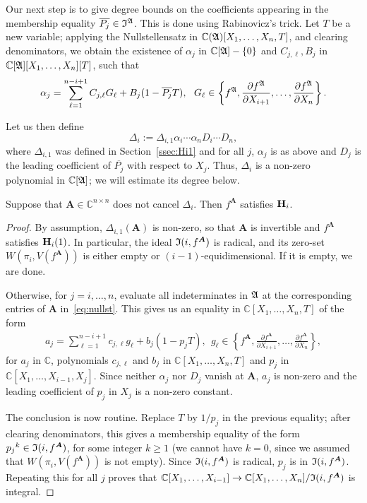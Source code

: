 \documentclass[sigconf]{acmart}
\def\mA{{\bm A}}
\def\pjb{\overline{P_{j}}}
\def\C{\mathbb{C}}
\def\D{\Delta}
\def\I{\frak{I}}
\def\A{\frak{A}}
\begin{document}
Our next step is to give degree bounds on the coefficients appearing
in the membership equality $\pjb \in\I^\A$. This is done using
Rabinovicz's trick. Let $T$ be a new variable; applying the
Nullstellensatz in $\C(\A)[X_1,\dots,X_n,T]$, and clearing
denominators, we obtain the existence of $\alpha_j$ in
$\C[\A]-\{0\}$ and $ C_{j,\ell},B_j$ in
$\C[\A][X_1,\dots,X_n][T]$, such that
\begin{align}\label{eq:nullst}
\alpha_j = \sum_{\ell=1}^{n-i+1} C_{j,\ell} G_\ell + B_j (1-\pjb T),\ \  G_\ell \in 
\left\{ 
f^\A,\frac{\partial f^\A}{\partial X_{i+1}},\hdots,\frac{\partial f^\A}{\partial X_n}
\right\}.
\end{align}

Let us then define 
$$\D_{i}:=\D_{i,1} \alpha_i \cdots \alpha_n D_i \cdots D_n,$$ where
$\D_{i,1}$ was defined in Section~\ref{ssec:Hi1} and for all $j$,
$\alpha_j$ is as above and $D_j$ is the leading coefficient of $\pjb$
with respect to $X_j$. Thus, $\D_{i}$ is a non-zero polynomial in
$\C[\A]$; we will estimate its degree below.

\begin{lemma}
  Suppose that $\mA \in \C^{n\times n}$ does not cancel $\D_{i}$. Then
  $f^\mA$ satisfies ${\bf H}_i$.
\end{lemma}
\begin{proof}
  By assumption, $\D_{i,1}(\mA)$ is non-zero, so that $\mA$ is
  invertible and $f^\mA$ satisfies ${\bf H}_i(1)$. In particular, the
  ideal $\I(i, f^\mA)$ is radical, and its zero-set
  $W(\pi_i,V(f^\mA))$ is either empty or $(i-1)$-equidimensional. If
  it is empty, we are done.

  Otherwise, for $j=i,\dots,n$, evaluate all indeterminates in $\A$ at the
  corresponding entries of $\mA$ in~\eqref{eq:nullst}. This gives us
  an equality in $\C[X_1,\dots,X_n,T]$ of the form
  \begin{align*}
    a_j = \sum_{\ell=1}^{n-i+1} c_{j,\ell} g_\ell + b_j (1-p_j T),\ \  g_\ell \in 
    \left\{ 
      f^\mA,\frac{\partial f^\mA}{\partial X_{i+1}},\hdots,\frac{\partial f^\mA}{\partial X_n}
    \right\},
  \end{align*}
  for $a_j$ in $\C$, polynomials $c_{j,\ell}$ and $b_j$ in
  $\C[X_1,\dots,X_n,T]$ and $p_j$ in
  $\C[X_1,\dots,X_{i-1},X_j]$. Since neither $\alpha_j$ nor $D_j$
  vanish at $\mA$, $a_j$ is non-zero and the leading coefficient of
  $p_j$ in $X_j$ is a non-zero constant.

  The conclusion is now routine. Replace $T$ by $1/p_j$ in the
  previous equality; after clearing denominators, this gives a
  membership equality of the form $p_j{}^k \in \I(i, f^\mA)$, for some
  integer $k \ge 1$ (we cannot have $k=0$, since we assumed that
  $W(\pi_i,V(f^\mA))$ is not empty). Since $\I(i, f^\mA)$ is radical,
  $p_j$ is in $\I(i, f^\mA)$. Repeating this for all $j$ proves that 
  $\C[X_1,\dots,X_{i-1}]\rightarrow\C[X_1,\dots,X_n]/\I(i, f^\mA)$
  is integral.
\end{proof}
\end{document}
